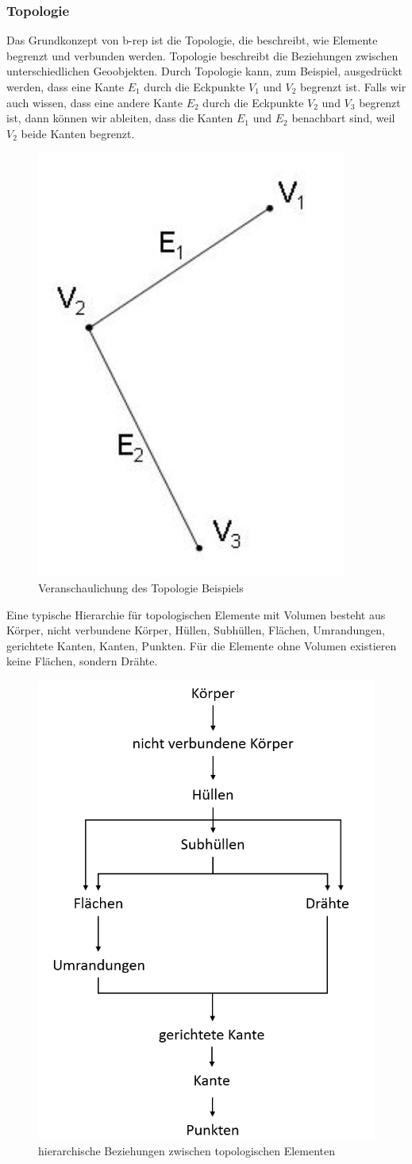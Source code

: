 \documentclass[14pt,a4paper,titlepage]{article}
\begin{document}
	\subsubsection{Topologie}
		Das Grundkonzept von \acf{b-rep} ist die Topologie, die beschreibt, wie Elemente begrenzt und verbunden werden. Topologie beschreibt die Beziehungen zwischen unterschiedlichen Geoobjekten.
		\bigbreak
		Durch Topologie kann, zum Beispiel, ausgedrückt werden, dass eine Kante \( E_1 \) durch die Eckpunkte  \( V_1 \) und \( V_2 \) begrenzt ist. Falls wir auch wissen, dass eine andere Kante \( E_2 \) durch die Eckpunkte \( V_2 \) und \( V_3 \) begrenzt ist, dann können wir ableiten, dass die Kanten \( E_1 \) und \( E_2 \) benachbart sind, weil \( V_2 \) beide Kanten begrenzt. 
				\begin{figure}[h!]
				\centering
				\includegraphics[width=0.25\linewidth]{beispieltopologie.png}
				\caption{Veranschaulichung des Topologie Beispiels}
				\label{fig9}
			\end{figure}
		\pagebreak
		\bigbreak
		Eine typische Hierarchie für topologischen Elemente mit Volumen besteht aus Körper, nicht verbundene Körper, Hüllen, Subhüllen, Flächen, Umrandungen, gerichtete Kanten, Kanten, Punkten. Für die Elemente ohne Volumen existieren keine Flächen, sondern Drähte.  
			\begin{figure}[h!]
			\centering
			\includegraphics[width=0.7\linewidth]{topology.png}
			\caption{hierarchische Beziehungen zwischen topologischen Elementen}
			\label{fig8}
			\end{figure}
	\pagebreak
\end{document}

